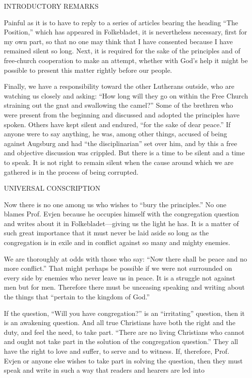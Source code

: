 
INTRODUCTORY REMARKS

Painful as it is to have to reply to a series of articles bearing the heading “The Position,” which has appeared in Folkebladet, it is nevertheless necessary, first for my own part, so that no one may think that I have consented because I have remained silent so long. Next, it is required for the sake of the principles and of free-church cooperation to make an attempt, whether with God’s help it might be possible to present this matter rightly before our people.

Finally, we have a responsibility toward the other Lutherans outside, who are watching us closely and asking: “How long will they go on within the Free Church straining out the gnat and swallowing the camel?” Some of the brethren who were present from the beginning and discussed and adopted the principles have spoken. Others have kept silent and endured, “for the sake of dear peace.” If anyone were to say anything, he was, among other things, accused of being against Augsburg and had “the disciplinarian” set over him, and by this a free and objective discussion was crippled. But there is a time to be silent and a time to speak. It is not right to remain silent when the cause around which we are gathered is in the process of being corrupted.

UNIVERSAL CONSCRIPTION

Now there is no one among us who wishes to “bury the principles.” No one blames Prof. Evjen because he occupies himself with the congregation question and writes about it in Folkebladet—giving us the light he has. It is a matter of such great importance that it must never be laid aside so long as the congregation is in exile and in conflict against so many and mighty enemies.

We are thoroughly at odds with those who say: “Now there shall be peace and no more conflict.” That might perhaps be possible if we were not surrounded on every side by enemies who never leave us in peace. It is a struggle not against men but for men. Therefore there must be unceasing speaking and writing about the things that “pertain to the kingdom of God.”

If the question, “Will you have congregation?” is an “irritating” question, then it is an awakening question. And all true Christians have both the right and the duty, and feel the need, to take part. “There are no living Christians who cannot and ought not take part in the solution of the congregation question.” They all have the right to love and suffer, to serve and to witness. If, therefore, Prof. Evjen or anyone else wishes to take part in solving the question, then they must speak and write in such a way that readers and hearers are led into

